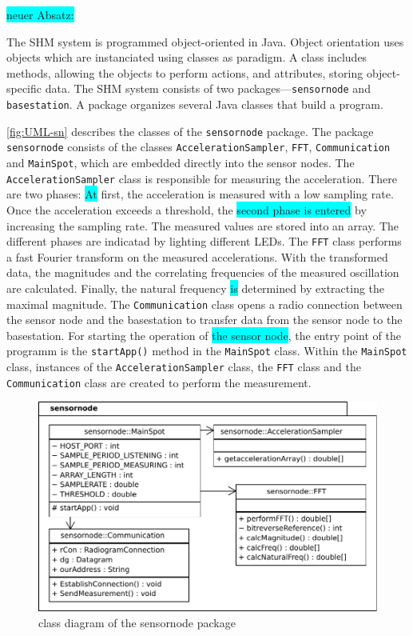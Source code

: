 \documentclass[12pt,a4paper]{scrartcl}
\begin{document}
\colorbox{cyan}{neuer Absatz:}

The SHM system is programmed object-oriented in Java. 
Object orientation uses objects which are instanciated using classes as paradigm. 
A class includes methods, allowing the objects to perform actions, and attributes, storing object-specific data.
The SHM system consists of two packages---\texttt{sensornode} and \texttt{basestation}.
A package organizes several Java classes that build a program.

\autoref{fig:UML-sn} describes the classes of the \texttt{sensornode} package.
The package \texttt{sensornode} consists of the classes \texttt{Acceleration\-Sampler}, \texttt{FFT}, \texttt{Communication} and \texttt{MainSpot}, which are embedded directly into the sensor nodes.
The \texttt{AccelerationSampler} class is responsible for measuring the acceleration.
There are two phases: \colorbox{cyan}{At} first, the acceleration is measured with a low sampling rate.
Once the acceleration exceeds a threshold, the \colorbox{cyan}{second phase is entered} by increasing the sampling rate. 
The measured values are stored into an array.
The different phases are indicatad by lighting different LEDs.
The \texttt{FFT} class performs a fast Fourier transform on the measured accelerations. 
With the transformed data, the magnitudes and the correlating frequencies of the measured oscillation are calculated.
Finally, the natural frequency \colorbox{cyan}{is} determined by extracting the maximal magnitude.
The \texttt{Communication} class opens a radio connection between the sensor node and the basestation to transfer data from the sensor node to the basestation.
For starting the operation of \colorbox{cyan}{the sensor node}, the entry point of the programm is the \texttt{startApp()} method in the \texttt{MainSpot} class. 
Within the \texttt{MainSpot} class, instances of the \texttt{Acceleration\-Sampler} class, the \texttt{FFT} class and the \texttt{Communication} class are created to perform the measurement.

\begin{figure}[h!]
    \centering
    \includegraphics{figures/uml-sensornode.pdf}
    \caption{class diagram of the sensornode package}
    \label{fig:UML-sn}
\end{figure}
\end{document}
